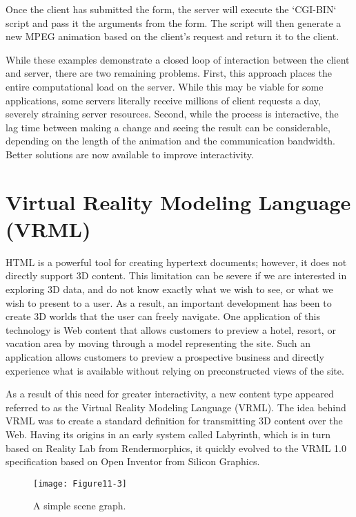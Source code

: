 Once the client has submitted the form, the server will execute the `CGI-BIN` script and pass it the arguments from the form. The script will then generate a new MPEG animation based on the client's request and return it to the client.

While these examples demonstrate a closed loop of interaction between the client and server, there are two remaining problems. First, this approach places the entire computational load on the server. While this may be viable for some applications, some servers literally receive millions of client requests a day, severely straining server resources. Second, while the process is interactive, the lag time between making a change and seeing the result can be considerable, depending on the length of the animation and the communication bandwidth. Better solutions are now available to improve interactivity.

\section{Virtual Reality Modeling Language (VRML)}

HTML is a powerful tool for creating hypertext documents; however, it does not directly support 3D content. This limitation can be severe if we are interested in exploring 3D data, and do not know exactly what we wish to see, or what we wish to present to a user. As a result, an important development has been to create 3D worlds that the user can freely navigate. One application of this technology is Web content that allows customers to preview a hotel, resort, or vacation area by moving through a model representing the site. Such an application allows customers to preview a prospective business and directly experience what is available without relying on preconstructed views of the site.

As a result of this need for greater interactivity, a new content type appeared referred to as the Virtual Reality Modeling Language (VRML). The idea behind VRML was to create a standard definition for transmitting 3D content over the Web. Having its origins in an early system called Labyrinth, which is in turn based on Reality Lab from Rendermorphics, it quickly evolved to the VRML 1.0 specification based on Open Inventor from Silicon Graphics.

\begin{figure}[!htb]
	\centering
	\texttt{[image: Figure11-3]}
	\caption{A simple scene graph.}
	\label{fig:Figure11-3}
\end{figure}

